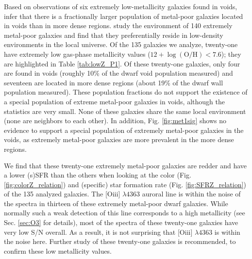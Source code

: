 Based on observations of six extremely low-metallicity galaxies found in voids, 
\citet{Pustilnik06, Pustilnik11a, Pustilnik13} infer that there is a 
fractionally larger population of metal-poor galaxies located in voids than in 
more dense regions.  \citet{Filho15} study the environment of 140 extremely 
metal-poor galaxies and find that they preferentially reside in low-density 
environments in the local universe.  Of the 135 galaxies we analyze, twenty-one 
have extremely low gas-phase metallicity values 
($12 + \log(\text{O}/\text{H}) < 7.6$); they are highlighted in Table 
\ref{tab:lowZ_P1}.  Of these twenty-one galaxies, only four are found in voids 
(roughly 10\% of the dwarf void population measured) and seventeen are located 
in more dense regions (about 19\% of the dwarf wall population measured).  These 
population fractions do not support the existence of a special population of 
extreme metal-poor galaxies in voids, although the statistics are very small.  
None of these galaxies share the same local environment (none are neighbors to 
each other).  In addition, Fig. \ref{fig:met1sig} shows no evidence to support a 
special population of extremely metal-poor galaxies in the voids, as extremely 
metal-poor galaxies are more prevalent in the more dense regions.



We find that these twenty-one extremely metal-poor galaxies are redder and have 
a lower (s)SFR than the others when looking at the color (Fig. 
\ref{fig:colorZ_relation}) and (specific) star formation rate (Fig. 
\ref{fig:SFRZ_relation}) of the 135 analyzed galaxies.  The [O{\sc iii}] 
$\lambda 4363$ auroral line is within the noise of the spectra in thirteen of 
these extremely metal-poor dwarf galaxies.  While normally such a weak detection 
of this line corresponds to a high metallicity (see Sec. \ref{sec:O3} for 
details), most of the spectra of these twenty-one galaxies have very low S/N 
overall.  As a result, it is not surprising that [O{\sc iii}] $\lambda 4363$ is 
within the noise here.  Further study of these twenty-one galaxies is 
recommended, to confirm these low metallicity values.

